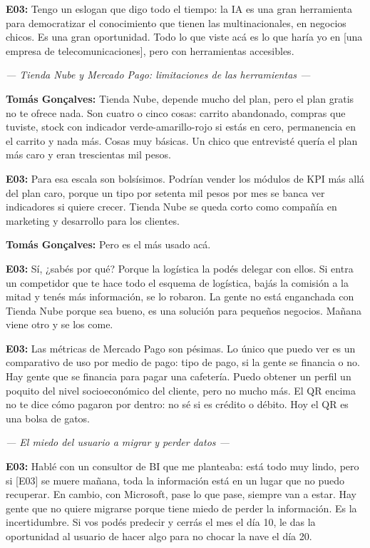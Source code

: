 \noindent\textbf{E03:} Tengo un eslogan que digo todo el tiempo: la IA es una gran herramienta para democratizar el conocimiento que tienen las multinacionales, en negocios chicos. Es una gran oportunidad. Todo lo que viste acá es lo que haría yo en [una empresa de telecomunicaciones], pero con herramientas accesibles.

\noindent\textit{--- Tienda Nube y Mercado Pago: limitaciones de las herramientas ---}

\noindent\textbf{Tomás Gonçalves:} Tienda Nube, depende mucho del plan, pero el plan gratis no te ofrece nada. Son cuatro o cinco cosas: carrito abandonado, compras que tuviste, stock con indicador verde-amarillo-rojo si estás en cero, permanencia en el carrito y nada más. Cosas muy básicas. Un chico que entrevisté quería el plan más caro y eran trescientas mil pesos.

\noindent\textbf{E03:} Para esa escala son bolsísimos. Podrían vender los módulos de KPI más allá del plan caro, porque un tipo por setenta mil pesos por mes se banca ver indicadores si quiere crecer. Tienda Nube se queda corto como compañía en marketing y desarrollo para los clientes.

\noindent\textbf{Tomás Gonçalves:} Pero es el más usado acá.

\noindent\textbf{E03:} Sí, ¿sabés por qué? Porque la logística la podés delegar con ellos. Si entra un competidor que te hace todo el esquema de logística, bajás la comisión a la mitad y tenés más información, se lo robaron. La gente no está enganchada con Tienda Nube porque sea bueno, es una solución para pequeños negocios. Mañana viene otro y se los come.

\noindent\textbf{E03:} Las métricas de Mercado Pago son pésimas. Lo único que puedo ver es un comparativo de uso por medio de pago: tipo de pago, si la gente se financia o no. Hay gente que se financia para pagar una cafetería. Puedo obtener un perfil un poquito del nivel socioeconómico del cliente, pero no mucho más. El QR encima no te dice cómo pagaron por dentro: no sé si es crédito o débito. Hoy el QR es una bolsa de gatos.

\noindent\textit{--- El miedo del usuario a migrar y perder datos ---}

\noindent\textbf{E03:} Hablé con un consultor de BI que me planteaba: está todo muy lindo, pero si [E03] se muere mañana, toda la información está en un lugar que no puedo recuperar. En cambio, con Microsoft, pase lo que pase, siempre van a estar. Hay gente que no quiere migrarse porque tiene miedo de perder la información. Es la incertidumbre. Si vos podés predecir y cerrás el mes el día 10, le das la oportunidad al usuario de hacer algo para no chocar la nave el día 20.

